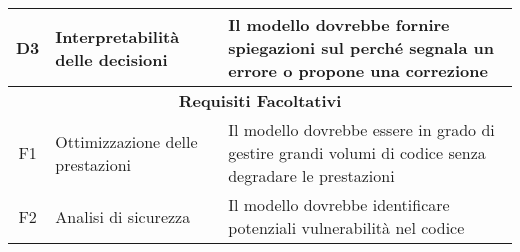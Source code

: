 \begin{tabularx}{\textwidth}{|c|X|X|}
    D3 & Interpretabilità delle decisioni & Il modello dovrebbe fornire spiegazioni sul perché segnala un errore o propone una correzione \\
    \hline

    \multicolumn{3}{|c|}{\textbf{Requisiti Facoltativi}} \\
    \hline

    F1 & Ottimizzazione delle prestazioni & Il modello dovrebbe essere in grado di gestire grandi volumi di codice senza degradare le prestazioni \\
    \hdashline

    F2 & Analisi di sicurezza & Il modello dovrebbe identificare potenziali vulnerabilità nel codice \\
    \hline

\end{tabularx}